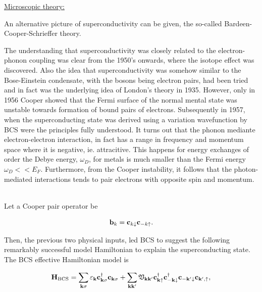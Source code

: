 \documentclass{homework}
\begin{document}
\clearpage

\underline{Microscopic theory:} 

An alternative picture of superconductivity can be given, the so-called Bardeen-Cooper-Schrieffer theory.

\begin{tcolorbox}[colback = LimeGreen, title = Historical Context:]

The understanding that superconductivity was closely related to the electron-phonon coupling was clear from the 1950's onwards, where the isotope effect was discovered. Also the idea that superconductivity was somehow similar to the Bose-Einstein condensate, with the bosons being electron pairs, had been tried and in fact was the underlying idea of London's theory in 1935. However, only in 1956 Cooper showed that the Fermi surface of the normal mental state was unstable towards formation of bound pairs of electrons. Subsequently in 1957, when the superconducting state was derived using a variation wavefunction by BCS were the principles fully understood. It turns out that the phonon mediante electron-electron interaction, in fact has a range in frequency and momentum space where it is negative, ie. attracitive. This happens for energy exchanges of order the Debye energy, $\omega_D$, for metals is much smaller than the Fermi energy $\omega_D << E_F$. Furthermore, from the Cooper instability, it follows that the photon-mediated interactions tends to pair electrons with opposite spin and momentum.

\end{tcolorbox}

\blanky \\

Let a Cooper pair operator be

\begin{equation}
    {\bf b}_k = {\bf c}_{k \downarrow} {\bf c}_{-k \uparrow}.
\end{equation}

Then, the previous two physical inputs, led BCS to suggest the following remarkably successful model Hamiltonian to explain the superconducting state. The BCS effective Hamiltonian model is 

\begin{equation}
    {\bf H}_{\textnormal{BCS}} = \sum_{{\bf k} \sigma} \varepsilon_{{\bf k}} {\bf c}_{{\bf k} \sigma}^\dagger {\bf c}_{{\bf k} \sigma} + \sum_{{\bf k} {\bf k}'} {\mathfrak{V}}_{{\bf k}{\bf k}'} {\bf c}_{{\bf k} \uparrow}^\dagger {\bf c}_{-{\bf k} \downarrow}^\dagger {\bf c}_{-{\bf k}' \downarrow} {\bf c}_{{\bf k}', \uparrow}, 
\end{equation}
\end{document}
